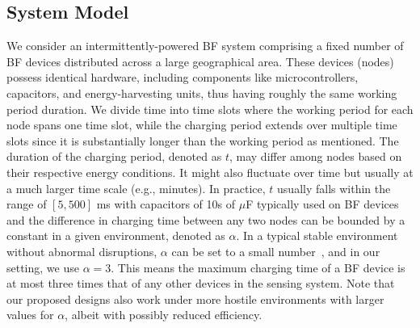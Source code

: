 \documentclass[lettersize,journal]{IEEEtran}
\begin{document}
\subsection{System Model}
\label{sec:sync:model}
We consider an intermittently-powered BF system comprising a fixed number of BF devices distributed across a large geographical area. These devices (nodes) possess identical hardware, including components like microcontrollers, capacitors, and energy-harvesting units, thus having roughly the same working period duration. We divide time into time slots where the working period for each node spans one time slot, while the charging period extends over multiple time slots since it is substantially longer than the working period as mentioned. The duration of the charging period, denoted as $t$, may differ among nodes based on their respective energy conditions. It might also fluctuate over time but usually at a much larger time scale (e.g., minutes). In practice, $t$ usually falls within the range of $[5, 500]$ ms with capacitors of 10s of $\mu$F typically used on BF devices and the difference in charging time between any two nodes can be bounded by a constant in a given environment, denoted as $\alpha$. In a typical stable environment without abnormal disruptions, $\alpha$ can be set to a small number~\cite{2021-nsdi-find, 2022-nsdi-bonito}, and in our setting, we use $\alpha=3$. This means the maximum charging time of a BF device is at most three times that of any other devices in the sensing system. Note that our proposed designs also work under more hostile environments with larger values for $\alpha$, albeit with possibly reduced efficiency.
\end{document}
